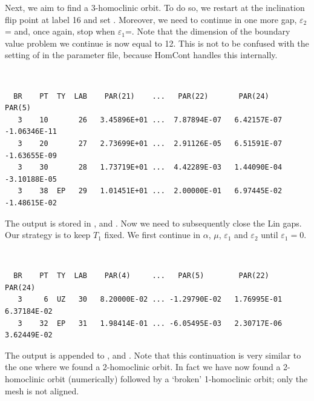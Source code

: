 \documentclass[12pt]{report}
\begin{document}
Next, we aim to find a 3-homoclinic orbit. To do so, we
restart at the inclination flip point at label 16 and set
. Moreover, we need to continue in one more
gap, $\varepsilon_2$= and, once again, stop
when $\varepsilon_1$=. Note that the 
dimension of the boundary value problem we continue
is now equal to 12. This is not to be confused with the setting
of  in the parameter file, because {\cal HomCont} handles this
internally.
\begin{center}
 \\
\end{center} 
\begin{verbatim}
  BR    PT  TY  LAB    PAR(21)    ...   PAR(22)       PAR(24)       PAR(5)     
   3    10       26   3.45896E+01 ...  7.87894E-07   6.42157E-07  -1.06346E-11
   3    20       27   2.73699E+01 ...  2.91126E-05   6.51591E-07  -1.63655E-09
   3    30       28   1.73719E+01 ...  4.42289E-03   1.44090E-04  -3.10188E-05
   3    38  EP   29   1.01451E+01 ...  2.00000E-01   6.97445E-02  -1.48615E-02
\end{verbatim}
The output is stored in ,   and .
Now we need to subsequently close the Lin gaps. Our strategy is to
keep $T_1$ fixed. We first continue in $\alpha$, $\mu$,
$\varepsilon_1$ and $\varepsilon_2$ until $\varepsilon_1=0$.
\begin{center}
 \\
\end{center} 
\begin{verbatim}
  BR    PT  TY  LAB    PAR(4)     ...   PAR(5)        PAR(22)       PAR(24)
   3     6  UZ   30   8.20000E-02 ... -1.29790E-02   1.76995E-01   6.37184E-02
   3    32  EP   31   1.98414E-01 ... -6.05495E-03   2.30717E-06   3.62449E-02
\end{verbatim}
The output is appended to ,   and .
Note that this continuation is very similar to the one where we found
a 2-homoclinic orbit. In fact we have now found a 2-homoclinic orbit
(numerically) followed by a `broken' 1-homoclinic orbit; only the mesh
is not aligned.
\end{document}
